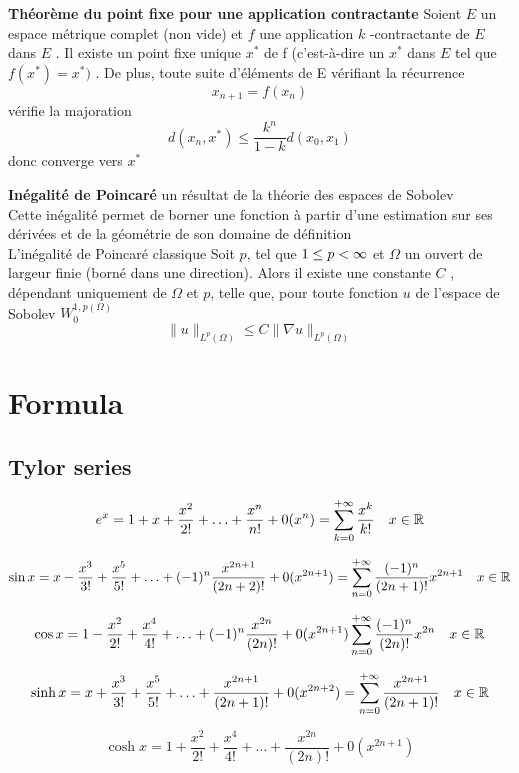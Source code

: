 \documentclass{article}
\begin{document}
\textbf{Th\'eor\`eme du point fixe pour une application contractante}\newline
Soient $ E$  un espace m\'etrique complet (non vide) et $ f$  une application $ k$ -contractante de $ E$  dans $ E$ . Il existe un point fixe unique $x^*$ de f (c'est-\`a-dire un $x^*$ dans $ E$  tel que $ f(x^* ) = x^*)$ . De plus, toute suite d'\'el\'ements de E v\'erifiant la r\'ecurrence
$$x_{n+1}=f(x_n)$$
v\'erifie la majoration
$$d(x_n,x^*) \le \frac {k^n}{1-k} d(x_0,x_1)$$
donc converge vers $x^*$
\bigskip

\textbf{In\'egalit\'e de Poincar\'e}
un r\'esultat de la th\'eorie des espaces de Sobolev\\
Cette in\'egalit\'e permet de borner une fonction \`a partir d'une estimation sur ses d\'eriv\'ees et de la g\'eom\'etrie de son domaine de d\'efinition\\
L'in\'egalit\'e de Poincar\'e classique
Soit $p$, tel que $ 1 \leq p < \infty$  et $\Omega$ un ouvert de largeur finie (born\'e dans une direction). Alors il existe une constante  $  C$  , d\'ependant uniquement de $\Omega$ et $p$, telle que, pour toute fonction $u$   de l'espace de Sobolev $W_0^{1,p(\Omega)}$
$$
\| u \|_{L^{p} (\Omega)} \leq C \| \nabla u \|_{L^{p} (\Omega)}
$$

\section{Formula}
\subsection{Tylor series}
$$
e^x
= 1+x+\frac{ x^2}{2!}
+ \ldots +
\frac{ x^n}{n!}
+0(x^n)
=\sum_{k=0}^{+\infty}\frac{ x^k}{k!}
\quad x \in \mathbb{R}
$$

$$
\sin x=x-\frac{ x^3}{3!}+\frac{ x^5}{5!}+\ldots+ (-1)^n \frac{x^{2n+1}}{(2n+2)!}+
0(x^{2n+1})
=
\sum_{n=0}^{+\infty} \frac{(-1)^n}{(2n+1)!} x^{2n+1}
\quad x \in \mathbb{R}
$$

$$
\cos x =
1 - \frac{ x^2}{2!} + \frac{ x^4}{4!}
+ \ldots +
(-1)^n \frac{ x^{2n}}{(2n)!} + 0(x^{2n+1})
\sum_{n=0}^{+\infty} \frac{(-1)^n}{(2n)!} x^{2n}
\quad x \in \mathbb{R}
$$

$$
\sinh x=x + \frac{ x^3}{3!}+\frac{ x^5}{5!}+\ldots+ \frac{x^{2n+1}}{(2n+1)!}+
0(x^{2n+2})
=
\sum_{n=0}^{+\infty} \frac{x^{2n+1}}{(2n+1)!}
\quad x \in \mathbb{R}
$$

$$
\cosh x =
1 + \frac{ x^2}{2!} + \frac{ x^4}{4!}
+ \ldots +
\frac{ x^{2n}}{(2n)!} + 0(x^{2n+1})
$$
\end{document}
